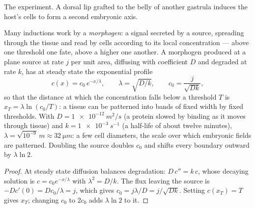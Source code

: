 \begin{omfigure}

{\small The  experiment. A dorsal lip grafted to the belly
of another gastrula induces the host's cells to form a second
embryonic axis.}
\end{omfigure}

\begin{theorem}\label{thm:b2:vertebrate-development:gradient}
Many inductions work by a \emph{morphogen}: a signal secreted by a
source, spreading through the tissue and read by cells according to
its local concentration --- above one threshold one fate, above a
higher one another. A morphogen produced at a plane source at rate
$j$ per unit area, diffusing with coefficient $D$ and degraded at
rate $k$, has at steady state the exponential profile
\[
c(x) = c_0\,e^{-x/\lambda}, \qquad \lambda = \sqrt{D/k}, \qquad c_0 = \frac{j}{\sqrt{Dk}},
\]
so that the distance at which the concentration falls below a
threshold $T$ is $x_T = \lambda\ln(c_0/T)$: a tissue can be
patterned into bands of fixed width by fixed thresholds. With $D =
\qty{1e-12}{m^2/s}$ (a protein slowed by binding as it moves through
tissue) and $k = \qty{1e-3}{s^{-1}}$ (a half-life of about twelve
minutes), $\lambda = \sqrt{10^{-9}}\,\unit{m} \approx
\qty{32}{\micro m}$: a few cell diameters,
the scale over which embryonic fields are patterned. Doubling the
source doubles $c_0$ and shifts every boundary outward by $\lambda
\ln 2$.
\end{theorem}
\begin{proof}
At steady state diffusion balances degradation: $D\,c'' = k\,c$,
whose decaying solution is $c = c_0 e^{-x/\lambda}$ with $\lambda^2 =
D/k$. The flux leaving the source is $-Dc'(0) = Dc_0/\lambda = j$,
which gives $c_0 = j\lambda/D = j/\sqrt{Dk}$. Setting $c(x_T) = T$
gives $x_T$; changing $c_0$ to $2c_0$ adds $\lambda\ln 2$ to it.
\end{proof}

